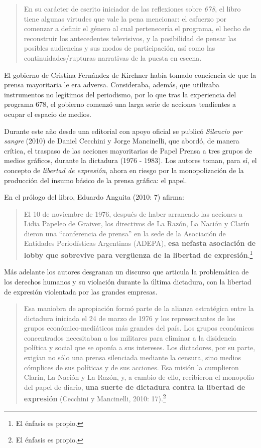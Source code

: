 \begin{quote}
En su carácter de escrito iniciador de las reflexiones sobre \emph{678}, el libro tiene algunas virtudes que vale la pena mencionar: el esfuerzo por comenzar a definir el género al cual pertenecería el programa, el hecho de reconstruir los antecedentes televisivos, y la posibilidad de pensar las posibles audiencias y sus modos de participación, así como las continuidades/rupturas narrativas de la puesta en escena.
\end{quote}

El gobierno de Cristina Fernández de Kirchner había tomado conciencia de que la prensa mayoritaria le era adversa. Consideraba, además, que utilizaba instrumentos no legítimos del periodismo, por lo que tras la experiencia del programa 678, el gobierno comenzó una larga serie de acciones tendientes a ocupar el espacio de medios.

Durante este año desde una editorial con apoyo oficial se publicó \emph{Silencio por sangre} (2010) de Daniel Cecchini y Jorge Mancinelli, que abordó, de manera crítica, el traspaso de las acciones mayoritarias de Papel Prensa a tres grupos de medios gráficos, durante la dictadura (1976 - 1983). Los autores toman, para sí, el concepto de \emph{libertad de expresión}, ahora en riesgo por la monopolización de la producción del insumo básico de la prensa gráfica: el papel.

En el prólogo del libro, Eduardo Anguita (2010: 7) afirma:

\begin{quote}
El 10 de noviembre de 1976, después de haber arrancado las acciones a Lidia Papeleo de Graiver, los directivos de La Razón, La Nación y Clarín dieron una \enquote{conferencia de prensa} en la sede de la Asociación de Entidades Periodísticas Argentinas (ADEPA), \textbf{esa nefasta asociación de lobby que sobrevive para vergüenza de la libertad de expresión}.\footnote{El énfasis es propio.}
\end{quote}

Más adelante los autores desgranan un discurso que articula la problemática de los derechos humanos y su violación durante la última dictadura, con la libertad de expresión violentada por las grandes empresas.

\begin{quote}
Esa maniobra de apropiación formó parte de la alianza estratégica entre la dictadura iniciada el 24 de marzo de 1976 y los representantes de los grupos económico-mediáticos más grandes del país. Los grupos económicos concentrados necesitaban a los militares para eliminar a la disidencia política y social que se oponía a sus intereses. Los dictadores, por su parte, exigían no sólo una prensa silenciada mediante la censura, sino medios cómplices de sus políticas y de sus acciones. Esa misión la cumplieron Clarín, La Nación y La Razón, y, a cambio de ello, recibieron el monopolio del papel de diario, \textbf{una suerte de dictadura contra la libertad de expresión} (Cecchini y Mancinelli, 2010: 17).\footnote{El énfasis es propio.}
\end{quote}


